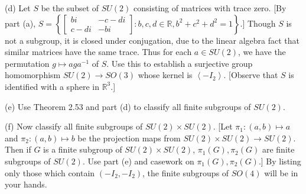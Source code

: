 \documentclass[leqno]{book}
\begin{document}
\begin{enumerate}
(d) Let $S$ be the subset of $SU(2)$ consisting of matrices with trace zero.  [By part (a), $S=\left\{\begin{bmatrix}bi&-c-di\\c-di&-bi\end{bmatrix}:b,c,d\in\mathbb R,b^2+c^2+d^2=1\right\}$.]  Though $S$ is not a subgroup, it is closed under conjugation, due to the linear algebra fact that similar matrices have the same trace.  Thus for each $a\in SU(2)$, we have the permutation $g\mapsto aga^{-1}$ of $S$.  Use this to establish a surjective group homomorphism $SU(2)\to SO(3)$ whose kernel is $\left<-I_2\right>$.  [Observe that $S$ is identified with a sphere in $\mathbb R^3$.]

(e) Use Theorem 2.53 and part (d) to classify all finite subgroups of $SU(2)$.

(f) Now classify all finite subgroups of $SU(2)\times SU(2)$.  [Let $\pi_1:(a,b)\mapsto a$ and $\pi_2:(a,b)\mapsto b$ be the projection maps from $SU(2)\times SU(2)\to SU(2)$.  Then if $G$ is a finite subgroup of $SU(2)\times SU(2)$, $\pi_1(G),\pi_2(G)$ are finite subgroups of $SU(2)$.  Use part (e) and casework on $\pi_1(G),\pi_2(G)$.]  By listing only those which contain $(-I_2,-I_2)$, the finite subgroups of $SO(4)$ will be in your hands.
\end{enumerate}
\end{document}

